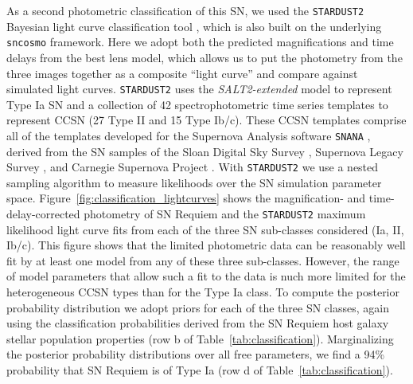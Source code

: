 \documentclass[12pt,dvipsnames]{article}
\def\SNABC{SN Requiem\xspace}
\begin{document}
As a second photometric classification of this SN, we used the {\tt STARDUST2} Bayesian light curve classification tool \cite{rodney_type_2014}, which is also built on the underlying {\tt sncosmo} framework. Here we adopt both the predicted magnifications and time delays from the best lens model, which allows us to put the photometry from the three images together as a composite ``light curve'' and compare against simulated light curves.  {\tt STARDUST2} uses the {\it SALT2-extended} model to represent Type Ia SN \cite{guy_salt2:_2007, pierel_extending_2018} and a collection of 42  spectrophotometric time series templates to represent CCSN (27 Type II and 15 Type Ib/c).  These CCSN templates comprise all of the templates developed for the Supernova Analysis software {\tt SNANA} \cite{kessler_snana:_2009}, derived from the SN samples of the Sloan Digital Sky Survey \cite{frieman_sloan_2008,sako_sloan_2008, dandrea_type_2010}, Supernova Legacy Survey \cite{astier_supernova_2006}, and Carnegie Supernova Project \cite{hamuy_carnegie_2006, stritzinger_he-rich_2009, morrell_carnegie_2012}.  With {\tt STARDUST2} we use a nested sampling algorithm to measure likelihoods over the SN simulation parameter space.  
Figure~\ref{fig:classification_lightcurves} shows the magnification- and time-delay-corrected photometry of \SNABC and the {\tt STARDUST2} maximum likelihood light curve fits from each of the three SN sub-classes considered (Ia, II, Ib/c). This figure shows that the limited photometric data can be reasonably well fit by at least one model from any of these three sub-classes. However, the range of model parameters that allow such a fit to the data is nuch more limited for the heterogeneous CCSN types than for the Type Ia class.   
To compute the posterior probability distribution we adopt priors for each of the three SN classes, again using the classification probabilities derived from the \SNABC host galaxy stellar population properties (row b of Table~\ref{tab:classification}). 
Marginalizing the posterior  probability distributions over all free parameters, we find a 94\% probability that \SNABC is of Type Ia (row d of Table~\ref{tab:classification}).  


\end{document}
